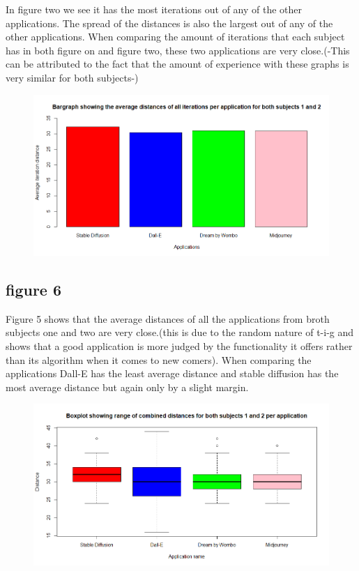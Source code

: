 \documentclass[]{report}
\begin{document}
In figure two we see it has the most iterations out of any of the other applications. The spread of the distances is also the largest out of any of the other applications. When comparing the amount of iterations that each subject has in both figure on and figure two, these two applications are very close.(-This can be attributed to the fact that the amount of experience with these graphs is very similar for both subjects-)



\begin{figure}[!htbp]
	\centering
	\includegraphics[width=1\linewidth]{Bargraph}
	\caption{}
	\label{fig:bargraph}
\end{figure}
\subsection{figure 6}
Figure 5 shows that the average distances of all the applications from broth subjects one and two are very close.(this is due to the random nature of t-i-g and shows that a good application is more judged by the functionality it offers rather than its algorithm when it comes to new comers). When comparing the applications Dall-E has the least average distance and stable diffusion has the most average distance but again only by a slight margin. 
	
	\begin{figure}[!htbp]
		\centering
		\includegraphics[width=1\linewidth]{boxplotWithAllData}
		\caption{}
		\label{fig:boxplotwithalldata}
	\end{figure}
\end{document}
